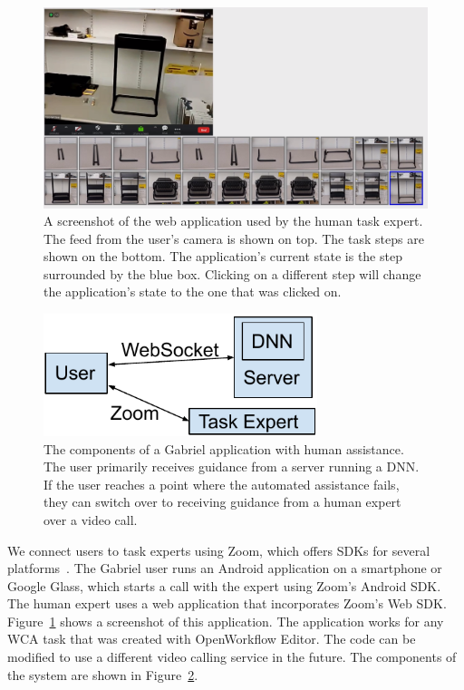 \begin{figure}[h]
  \includegraphics[width=14cm]{figures/expert_ui.png}
  \caption{A screenshot of the web application used by the human task expert.
    The feed from the user's camera is shown on top. The task steps are shown on
    the bottom. The application's current state is the step surrounded by the
    blue box. Clicking on a different step will change the application's state
    to the one that was clicked on.
  }\label{fig:expertui}
\end{figure}

\begin{figure}[h]
  \includegraphics[width=8cm]{figures/human_assitance.pdf}
  \caption{The components of a Gabriel application with human assistance. The
    user primarily receives guidance from a server running a DNN. If the user
    reaches a point where the automated assistance fails, they can switch over
    to receiving guidance from a human expert over a video call.
  }\label{fig:expert_components}
\end{figure}

We connect users to task experts using Zoom, which offers SDKs for several
platforms~\cite{Zoom}. The Gabriel user runs an Android application on a
smartphone or Google Glass, which starts a call with the expert using Zoom's
Android SDK.
The human expert uses a web application that incorporates Zoom's Web SDK.
Figure~\ref{fig:expertui} shows a screenshot of this application.
The application works for any WCA task that was created with OpenWorkflow
Editor.
The code can
be modified to use a different video calling service in the future.
The components of the system are shown in Figure~\ref{fig:expert_components}.

